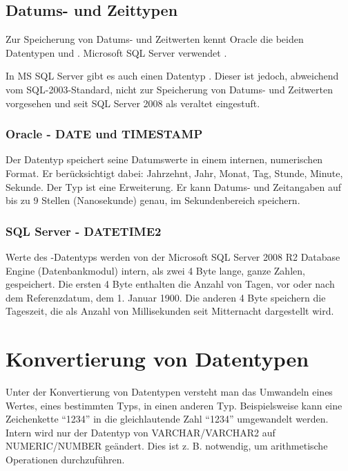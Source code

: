 \subsection{Datums- und Zeittypen}
Zur Speicherung von Datums- und Zeitwerten kennt Oracle die beiden Datentypen  und . Microsoft SQL Server verwendet .
\clearpage
\begin{merke}
    In MS SQL Server gibt es auch einen Datentyp . Dieser ist jedoch, abweichend vom SQL-2003-Standard, nicht zur Speicherung von Datums- und Zeitwerten vorgesehen und seit SQL Server 2008 als veraltet eingestuft.
\end{merke}
\subsubsection{Oracle - DATE und TIMESTAMP}
Der Datentyp  speichert seine Datumswerte in einem internen, numerischen Format. Er berücksichtigt dabei: Jahrzehnt, Jahr, Monat, Tag, Stunde, Minute, Sekunde. Der Typ  ist eine Erweiterung. Er kann Datums- und Zeitangaben auf bis zu 9 Stellen (Nanosekunde) genau, im Sekundenbereich speichern.
\subsubsection{SQL Server - DATETIME2}
Werte des -Datentyps werden von der Microsoft SQL Server 2008 R2 Database Engine (Datenbankmodul) intern, als zwei 4 Byte lange, ganze Zahlen, gespeichert. Die ersten 4 Byte enthalten die Anzahl von Tagen, vor oder nach dem Referenzdatum, dem 1. Januar 1900. Die anderen 4 Byte speichern die Tageszeit, die als Anzahl von Millisekunden seit Mitternacht dargestellt wird.
\section{Konvertierung von Datentypen}
Unter der Konvertierung von Datentypen versteht man das Umwandeln eines Wertes, eines bestimmten Typs, in einen anderen Typ. Beispielsweise kann eine Zeichenkette \enquote{1234} in die gleichlautende Zahl \enquote{1234} umgewandelt werden. Intern wird nur der Datentyp von VARCHAR/VARCHAR2 auf NUMERIC/NUMBER geändert. Dies ist z. B. notwendig, um arithmetische Operationen durchzuführen.
